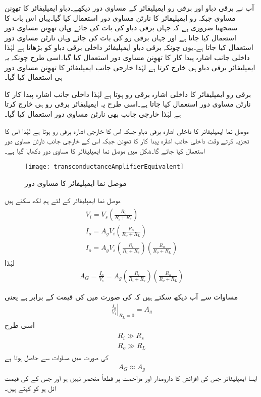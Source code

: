 آپ نے برقی دباو اور برقی رو ایمپلیفائر کے مساوی دور دیکھے۔دباو ایمپلیفائر کا تھوِنن  مساوی جبکہ رو ایمپلیفائر کا نارٹن مساوی دور استعمال کیا گیا۔یہاں اس بات کا سمجھنا ضروری ہے کہ جہاں برقی دباو کی بات کی جائے وہاں تھوِنن  مساوی دور استعمال کیا جاتا ہے اور جہاں برقی رو کی بات کی جائے وہاں نارٹن مساوی دور استعمال کیا جاتا ہے۔یوں چونکہ برقی دباو ایمپلیفائر داخلی برقی دباو کو بڑھاتا ہے لہٰذا داخلی جانب اشارہ پیدا کار کا تھوِنن  مساوی دور استعمال کیا گیا۔اسی طرح چونکہ یہ ایمپلیفائر برقی دباو ہی خارج کرتا ہے لہٰذا خارجی جانب ایمپلیفائر کا تھوِنن  مساوی دور ہی استعمال کیا گیا۔

برقی رو ایمپلیفائر کا داخلی اشارہ برقی رو ہوتا ہے لہٰذا داخلی جانب اشارہ پیدا کار کا نارٹن مساوی دور استعمال کیا جاتا ہے۔اسی طرح یہ ایمپلیفائر برقی رو ہی خارج کرتا ہے لہٰذا خارجی جانب بھی نارٹن مساوی دور استعمال کیا گیا۔

موصل نما ایمپلیفائر کا داخلی اشارہ برقی دباو جبکہ اس کا خارجی اشارہ برقی رو ہوتا ہے لہٰذا اس کا تجزیہ کرتے وقت داخلی جانب اشارہ پیدا کار کا تھوِنن  جبکہ اس کے خارجی جانب نارٹن مساوی دور استعمال کیا جائے گا۔شکل  میں موصل نما ایمپلیفائر کا مساوی دور دکھایا گیا ہے۔
\begin{figure}
\centering
\texttt{[image: transconductanceAmplifierEquivalent]}
\caption{موصل نما ایمپلیفائر کا مساوی دور}
\label{شکل_واپسی_موصلیت_نما_ایمپلیفائر_کا_مساوی_دور}
\end{figure}
موصل نما ایمپلیفائر کے لئے ہم لکھ سکتے ہیں
\begin{gather} \label{مساوات_واپسی_موصلیت_نما_خارجی_رو}
\begin{aligned}
V_i = V_s \left(\frac{R_i}{R_i+R_s}\right)\\
I_o=A_g V_i \left(\frac{R_o}{R_o+R_L}\right) \\
I_o = A_g V_s  \left (\frac{R_i}{R_i+R_s} \right ) \left(\frac{R_o}{R_o+R_L} \right )
\end{aligned}
\end{gather}
لہٰذا
\begin{align} \label{مساوات_واپسی_کل_موصلیت_نما}
A_G=\frac{I_o}{V_s}=A_g \left (\frac{R_i}{R_i+R_s} \right ) \left(\frac{R_o}{R_o+R_L} \right )
\end{align}

مساوات  سے آپ دیکھ سکتے ہیں کہ  کی صورت میں  کی قیمت  کے برابر ہے یعنی 
\begin{align}
\left.  \frac{I_o}{V_i} \right |_{R_L =0} =A_g
\end{align}
اسی طرح 
\begin{gather}
\begin{aligned}
R_i \gg R_s \\
R_o \gg R_L
\end{aligned}
\end{gather}
 کی صورت میں مساوات   سے حاصل ہوتا ہے
\begin{align}
A_G \approx A_g
\end{align}
ایسا ایمپلیفائر جس کی افزائش  کا دارومدار  اور مزاحمت  پر قطعاً منحصر نہیں ہو اور جس کے  کی قیمت اٹل ہو کو  کہتے ہیں۔

